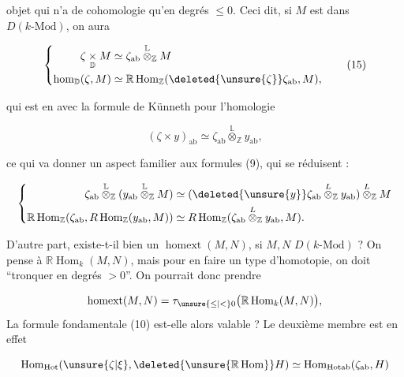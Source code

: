 objet qui n'a de cohomologie qu'en degrés $\leq 0$. Ceci dit, si $M$ est dans $D(k\text{-}\mathrm{Mod})$, on aura

\[
\left\{\begin{aligned}
\zeta\mathbin{\underset{\mathbb D}{\times}}M&\simeq\zeta_{\mathrm{ab}}\overset{\mathbb L}{\otimes}_{\mathbb Z}M\\
\operatorname{hom}_{\mathbb D}(\zeta,M)&\simeq\mathbb R\operatorname{Hom}_{\mathbb Z}(\deleted{\unsure{\zeta}}\zeta_{\mathrm{ab}},M),
\end{aligned}\right.
\tag*{(15)}
\]

 qui est en  avec la formule de Künneth pour l'homologie

\[
(\zeta\times y)_{\mathrm{ab}}\simeq\zeta_{\mathrm{ab}}\overset{\mathbb L}{\otimes}_{\mathbb Z}y_{\mathrm{ab}},
\tag*{(16)}
\]

ce qui va donner un aspect familier aux formules (9), qui se réduisent :

\[
\left\{\begin{aligned}
\zeta_{\mathrm{ab}}\overset{\mathbb L}{\otimes}_{\mathbb Z}
(y_{\mathrm{ab}}\overset{\mathbb L}{\otimes}_{\mathbb Z}M)
&\simeq(\deleted{\unsure{y}}\zeta_{\mathrm{ab}}\overset{L}{\otimes}_{\mathbb Z}y_{\mathrm{ab}})\overset{L}{\otimes}_{\mathbb Z}M\\
\mathbb R\operatorname{Hom}_{\mathbb Z}(\zeta_{\mathrm{ab}},R\operatorname{Hom}_{\mathbb Z}(y_{\mathrm{ab}},M))
&\simeq R\operatorname{Hom}_{\mathbb Z}(\zeta_{\mathrm{ab}}\overset{L}{\otimes}_{\mathbb Z}y_{\mathrm{ab}},M).
\end{aligned}\right.
\]


D'autre part, existe-t-il bien un $\operatorname{homext}(M,N)$, si $M,N$  $D(k\text{-}\mathrm{Mod})$ ? On pense à $\mathbb R\operatorname{Hom}_k(M,N)$, mais pour en faire un type d'homotopie, on doit ``tronquer en degrés $>0$''. On pourrait donc prendre

\[
\operatorname{homext}(M,N)=\tau_{\unsure{\leq|<}0}\bigl(\mathbb R\operatorname{Hom}_k(M,N)\bigr),
\]
La formule fondamentale (10) est-elle alors valable ? Le deuxième membre est en effet


\[
\operatorname{Hom}_{\mathrm{Hot}}(\unsure{\zeta|\xi},\deleted{\unsure{\mathbb R\operatorname{Hom}}}H)\simeq
\operatorname{Hom}_{\mathrm{Hotab}}(\zeta_{\mathrm{ab}},H)
\]

